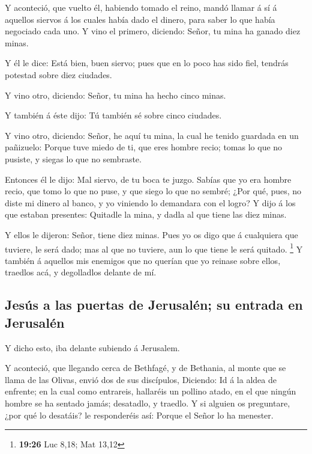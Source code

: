  Y aconteció, que vuelto él, habiendo tomado el reino,
mandó llamar á sí á aquellos siervos á los cuales había dado el dinero,
para saber lo que había negociado cada uno.  Y vino el
primero, diciendo: Señor, tu mina ha ganado diez minas.

 Y él le dice: Está bien, buen siervo; pues que en lo poco
has sido fiel, tendrás potestad sobre diez ciudades.

 Y vino otro, diciendo: Señor, tu mina ha hecho cinco
minas.

 Y también á éste dijo: Tú también sé sobre cinco ciudades.

 Y vino otro, diciendo: Señor, he aquí tu mina, la cual he
tenido guardada en un pañizuelo:  Porque tuve miedo de ti,
que eres hombre recio; tomas lo que no pusiste, y siegas lo que no
sembraste.

 Entonces él le dijo: Mal siervo, de tu boca te juzgo.
Sabías que yo era hombre recio, que tomo lo que no puse, y que siego lo
que no sembré;  ¿Por qué, pues, no diste mi dinero al
banco, y yo viniendo lo demandara con el logro?  Y dijo á
los que estaban presentes: Quitadle la mina, y dadla al que tiene las
diez minas.

 Y ellos le dijeron: Señor, tiene diez minas. 
Pues yo os digo que á cualquiera que tuviere, le será dado; mas al que
no tuviere, aun lo que tiene le será quitado. \footnote{\textbf{19:26}
  Luc 8,18; Mat 13,12}  Y también á aquellos mis enemigos
que no querían que yo reinase sobre ellos, traedlos acá, y degolladlos
delante de mí.

\hypertarget{jesuxfas-a-las-puertas-de-jerusaluxe9n-su-entrada-en-jerusaluxe9n}{%
\subsection{Jesús a las puertas de Jerusalén; su entrada en
Jerusalén}\label{jesuxfas-a-las-puertas-de-jerusaluxe9n-su-entrada-en-jerusaluxe9n}}

 Y dicho esto, iba delante subiendo á Jerusalem.

 Y aconteció, que llegando cerca de Bethfagé, y de
Bethania, al monte que se llama de las Olivas, envió dos de sus
discípulos,  Diciendo: Id á la aldea de enfrente; en la
cual como entrareis, hallaréis un pollino atado, en el que ningún hombre
se ha sentado jamás; desatadlo, y traedlo.  Y si alguien os
preguntare, ¿por qué lo desatáis? le responderéis así: Porque el Señor
lo ha menester.

